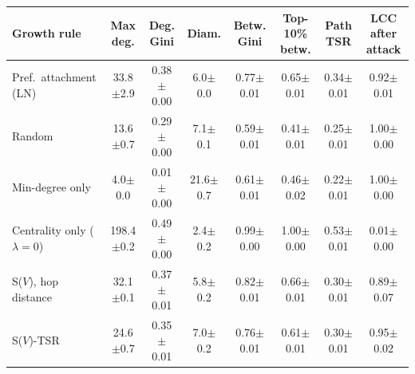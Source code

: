 \begin{tabular}{lccccccc}
\toprule
Growth rule & Max deg. & Deg. Gini & Diam. & Betw. Gini & Top-10\% betw. & Path TSR & LCC after attack \\
\midrule
Pref.\ attachment (LN) & 33.8$\pm$2.9 & 0.38$\pm$0.00 & 6.0$\pm$0.0 & 0.77$\pm$0.01 & 0.65$\pm$0.01 & 0.34$\pm$0.01 & 0.92$\pm$0.01 \\
Random & 13.6$\pm$0.7 & 0.29$\pm$0.00 & 7.1$\pm$0.1 & 0.59$\pm$0.01 & 0.41$\pm$0.01 & 0.25$\pm$0.01 & 1.00$\pm$0.00 \\
Min-degree only & 4.0$\pm$0.0 & 0.01$\pm$0.00 & 21.6$\pm$0.7 & 0.61$\pm$0.01 & 0.46$\pm$0.02 & 0.22$\pm$0.01 & 1.00$\pm$0.00 \\
Centrality only ($\lambda{=}0$) & 198.4$\pm$0.2 & 0.49$\pm$0.00 & 2.4$\pm$0.2 & 0.99$\pm$0.00 & 1.00$\pm$0.00 & 0.53$\pm$0.01 & 0.01$\pm$0.00 \\
S($V$), hop distance & 32.1$\pm$0.1 & 0.37$\pm$0.01 & 5.8$\pm$0.2 & 0.82$\pm$0.01 & 0.66$\pm$0.01 & 0.30$\pm$0.01 & 0.89$\pm$0.07 \\
S($V$)-TSR & 24.6$\pm$0.7 & 0.35$\pm$0.01 & 7.0$\pm$0.2 & 0.76$\pm$0.01 & 0.61$\pm$0.01 & 0.30$\pm$0.01 & 0.95$\pm$0.02 \\
\bottomrule
\end{tabular}
